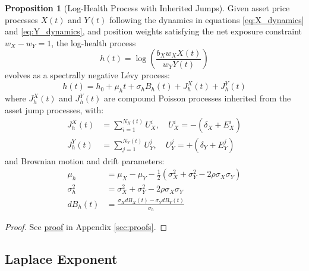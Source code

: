 \documentclass{article}
\theoremstyle{definition}
\newtheorem{proposition}{Proposition}[section]
\newcommand{\proofref}[1]{\hyperlink{#1}{proof}}
\begin{document}
\begin{proposition}[Log-Health Process with Inherited Jumps]
\label{prop:log_health_dynamics}
Given asset price processes $X(t)$ and $Y(t)$ following the dynamics in equations \eqref{eq:X_dynamics} and \eqref{eq:Y_dynamics}, and position weights satisfying the net exposure constraint $w_X - w_Y = 1$, the log-health process
\begin{equation}
h(t) = \log\left( \frac{b_X w_X X(t)}{w_Y Y(t)} \right)
\end{equation}
evolves as a spectrally negative Lévy process:
\begin{equation}
h(t) = h_0 + \mu_h t + \sigma_h B_h(t) + J_h^X(t) + J_h^Y(t) \label{eq:log_health_full}
\end{equation}
where $J_h^X(t)$ and $J_h^Y(t)$ are compound Poisson processes inherited from the asset jump processes, with:
\begin{align}
J_h^X(t) &= \sum_{i=1}^{N_X(t)} U_X^i, \quad U_X^i = -(\delta_X + E_X^i) \label{eq:jump_X_health}\\
J_h^Y(t) &= \sum_{j=1}^{N_Y(t)} U_Y^j, \quad U_Y^j = +(\delta_Y + E_Y^j) \label{eq:jump_Y_health}
\end{align}
and Brownian motion and drift parameters:
\begin{align}
\mu_h &= \mu_X - \mu_Y - \frac{1}{2}(\sigma_X^2 + \sigma_Y^2 - 2\rho\sigma_X\sigma_Y) \label{eq:drift_h}\\
\sigma_h^2 &= \sigma_X^2 + \sigma_Y^2 - 2\rho\sigma_X\sigma_Y \label{eq:vol_h}\\
dB_h(t) &= \frac{\sigma_X dB_X(t) - \sigma_Y dB_Y(t)}{\sigma_h} \label{eq:brownian_h}
\end{align}
\end{proposition}

\begin{proof}
See \proofref{prop:log_health_dynamics} in Appendix \ref{sec:proofs}.
\end{proof}

\subsection{Laplace Exponent}
\end{document}
